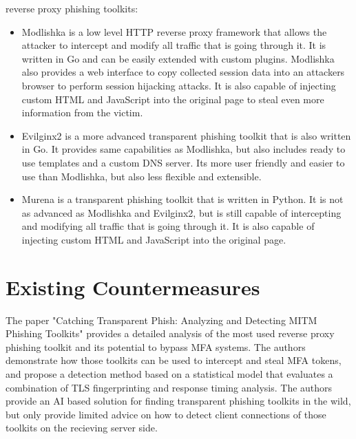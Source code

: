 \documentclass[12pt]{scrbook}
\begin{document}
reverse proxy phishing toolkits:
\begin{itemize}
  \item Modlishka \cite{modlishka} is a low level HTTP reverse proxy framework that allows the
    attacker to intercept and modify all traffic that is going through it. It is
    written in Go and can be easily extended with custom plugins. Modlishka also
    provides a web interface to copy collected session data into an attackers
    browser to perform session hijacking attacks. It is also capable of injecting
    custom HTML and JavaScript into the original page to steal even more
    information from the victim.
  \item Evilginx2 \cite{evilginx2} is a more advanced transparent phishing
    toolkit that is also written in Go. It provides same capabilities as
    Modlishka, but also includes ready to use templates and a custom DNS server.
    Its more user friendly and easier to use than Modlishka, but also less
    flexible and extensible.
  \item Murena \cite{murena} is a transparent phishing toolkit that is written
    in Python. It is not as advanced as Modlishka and Evilginx2, but is still
    capable of intercepting and modifying all traffic that is going through it.
    It is also capable of injecting custom HTML and JavaScript into the original
    page.
\end{itemize}

\section{Existing Countermeasures}
The paper "Catching Transparent Phish:
Analyzing and Detecting MITM Phishing Toolkits" \cite{kondracki2021catching}
provides a detailed analysis of the most used reverse proxy phishing toolkit and
its potential to bypass MFA systems. The authors demonstrate how those toolkits
can be used to intercept and steal MFA tokens, and propose a detection method
based on a statistical model that evaluates a combination of TLS fingerprinting
and response timing analysis. The authors provide an AI based solution for
finding transparent phishing toolkits in the wild, but only provide limited
advice on how to detect client connections of those toolkits on the recieving
server side.
\end{document}
